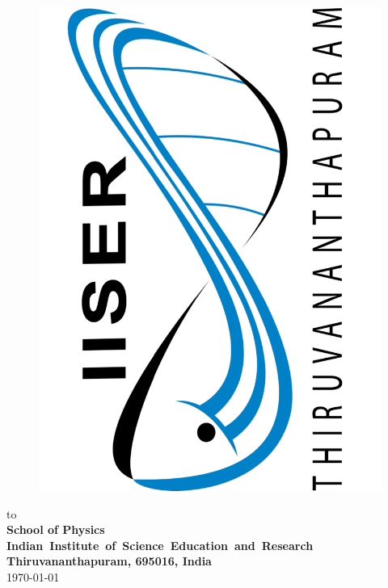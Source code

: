\documentclass[12pt, a4wide]{report}
\begin{document}
\begin{titlepage}
\begin{center}
\begin{figure}[h]
  \begin{center}
  \includegraphics[scale=0.15, angle=-90]{images/IISER_Logo.pdf}
  \end{center}
\end{figure}
\vspace*{3.5mm}
{to} \\ 
\vspace{2mm}
{\bf\large School of Physics} \\
{\bf\large \mbox{Indian Institute of Science Education and Research}}\\
{\bf\large Thiruvananthapuram, 695016, India}\\ 
\vspace{2mm}
\today
\end{center}
\end{titlepage}
\clearpage
\end{document}
